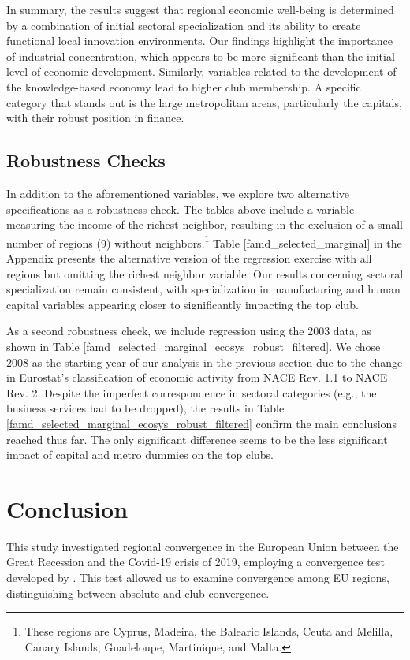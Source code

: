 \documentclass[11pt]{article}
\begin{document}
In summary, the results suggest that regional economic well-being is determined by a combination of initial sectoral specialization and its ability to create functional local innovation environments. Our findings highlight the importance of industrial concentration, which appears to be more significant than the initial level of economic development. Similarly, variables related to the development of the knowledge-based economy lead to higher club membership. A specific category that stands out is the large metropolitan areas, particularly the capitals, with their robust position in finance.

\subsection{Robustness Checks}
In addition to the aforementioned variables, we explore two alternative specifications as a robustness check. The tables above include a variable measuring the income of the richest neighbor, resulting in the exclusion of a small number of regions (9) without neighbors.\footnote{These regions are Cyprus, Madeira, the Balearic Islands, Ceuta and Melilla, Canary Islands, Guadeloupe, Martinique, and Malta.} Table \ref{famd_selected_marginal} in the Appendix presents the alternative version of the regression exercise with all regions but omitting the richest neighbor variable. Our results concerning sectoral specialization remain consistent, with specialization in manufacturing and human capital variables appearing closer to significantly impacting the top club.

As a second robustness check, we include regression using the 2003 data, as shown in Table \ref{famd_selected_marginal_ecosys_robust_filtered}.  We chose 2008 as the starting year of our analysis in the previous section due to the change in Eurostat's classification of economic activity from NACE Rev. 1.1 to NACE Rev. 2. Despite the imperfect correspondence in sectoral categories (e.g., the business services had to be dropped), the results in Table \ref{famd_selected_marginal_ecosys_robust_filtered} confirm the main conclusions reached thus far. The only significant difference seems to be the less significant impact of capital and metro dummies on the top clubs.

\section{Conclusion}

This study investigated regional convergence in the European Union between the Great Recession and the Covid-19 crisis of 2019, employing a convergence test developed by \citet{phillips2009economic}. This test allowed us to examine convergence among EU regions, distinguishing between absolute and club convergence.
\end{document}
